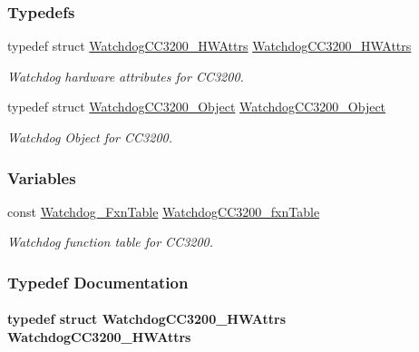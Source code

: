 \subsubsection*{Typedefs}
\begin{DoxyCompactItemize}
\item 
typedef struct \hyperlink{struct_watchdog_c_c3200___h_w_attrs}{Watchdog\+C\+C3200\+\_\+\+H\+W\+Attrs} \hyperlink{_watchdog_c_c3200_8h_a93a2e6a65ad04b5f64ba46a7ad314fa0}{Watchdog\+C\+C3200\+\_\+\+H\+W\+Attrs}
\begin{DoxyCompactList}\small\item\em Watchdog hardware attributes for C\+C3200. \end{DoxyCompactList}\item 
typedef struct \hyperlink{struct_watchdog_c_c3200___object}{Watchdog\+C\+C3200\+\_\+\+Object} \hyperlink{_watchdog_c_c3200_8h_acac7932b9436e05c5f1a1901739cad15}{Watchdog\+C\+C3200\+\_\+\+Object}
\begin{DoxyCompactList}\small\item\em Watchdog Object for C\+C3200. \end{DoxyCompactList}\end{DoxyCompactItemize}
\subsubsection*{Variables}
\begin{DoxyCompactItemize}
\item 
const \hyperlink{struct_watchdog___fxn_table}{Watchdog\+\_\+\+Fxn\+Table} \hyperlink{_watchdog_c_c3200_8h_aa8da6260d2ca5dbe363e6d82748e9375}{Watchdog\+C\+C3200\+\_\+fxn\+Table}
\begin{DoxyCompactList}\small\item\em Watchdog function table for C\+C3200. \end{DoxyCompactList}\end{DoxyCompactItemize}


\subsubsection{Typedef Documentation}
\paragraph[{Watchdog\+C\+C3200\+\_\+\+H\+W\+Attrs}]{\setlength{\rightskip}{0pt plus 5cm}typedef struct {\bf Watchdog\+C\+C3200\+\_\+\+H\+W\+Attrs}  {\bf Watchdog\+C\+C3200\+\_\+\+H\+W\+Attrs}}\label{_watchdog_c_c3200_8h_a93a2e6a65ad04b5f64ba46a7ad314fa0}


